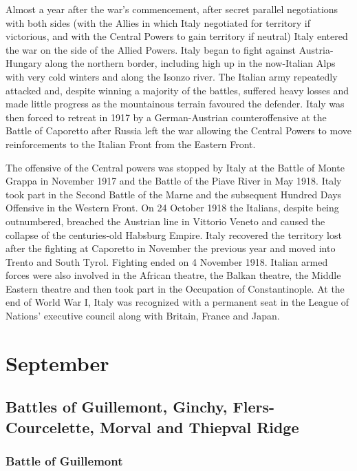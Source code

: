 \documentclass[a4paper,]{book}
\begin{document}
Almost a year after the war's commencement, after secret parallel negotiations with both sides (with the Allies in which Italy negotiated for territory if victorious, and with the Central Powers to gain territory if neutral) Italy entered the war on the side of the Allied Powers. Italy began to fight against Austria-Hungary along the northern border, including high up in the now-Italian Alps with very cold winters and along the Isonzo river. The Italian army repeatedly attacked and, despite winning a majority of the battles, suffered heavy losses and made little progress as the mountainous terrain favoured the defender. Italy was then forced to retreat in 1917 by a German-Austrian counteroffensive at the Battle of Caporetto after Russia left the war allowing the Central Powers to move reinforcements to the Italian Front from the Eastern Front.

The offensive of the Central powers was stopped by Italy at the Battle of Monte Grappa in November 1917 and the Battle of the Piave River in May 1918. Italy took part in the Second Battle of the Marne and the subsequent Hundred Days Offensive in the Western Front. On 24 October 1918 the Italians, despite being outnumbered, breached the Austrian line in Vittorio Veneto and caused the collapse of the centuries-old Habsburg Empire. Italy recovered the territory lost after the fighting at Caporetto in November the previous year and moved into Trento and South Tyrol. Fighting ended on 4 November 1918. Italian armed forces were also involved in the African theatre, the Balkan theatre, the Middle Eastern theatre and then took part in the Occupation of Constantinople. At the end of World War I, Italy was recognized with a permanent seat in the League of Nations' executive council along with Britain, France and Japan. 


\chapter{September}

\section{Battles of Guillemont, Ginchy, Flers-Courcelette, Morval and Thiepval Ridge}

\subsection{Battle of Guillemont}
\end{document}
